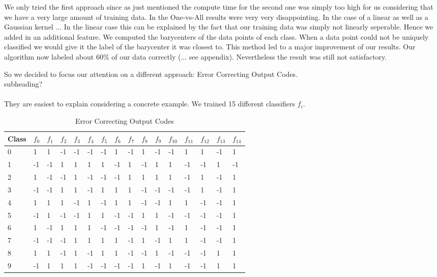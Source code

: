 We only tried the first approach since as just mentioned the compute time for the second one was simply too high for us considering that we have a very large amount of training data. In the One-vs-All results were very very disappointing. In the case of a linear as well as a Gaussian kernel ... In the linear case this can be explained by the fact that our training data was simply not linearly seperable. 
Hence we added in an additional feature. We computed the barycenters of the data points of each class. When a data point could not be uniquely classified we would give it the label of the barycenter it was closest to. This method led to a major improvement of our results. Our algorithm now labeled about 60\% of our data correctly (... see appendix).  Nevertheless the result was still not satisfactory. 

So we decided to focus our attention on a different approach: Error Correcting Output Codes. 
\\
subheading? \\
\\
They are easiest to explain considering a concrete example. We trained 15 different classifiers $f_i$. 

\begin{table}[ht!]
	\centering
	\caption{Error Correcting Output Codes}
	\label{Codewords}
	\begin{tabular}{|l|l|l|l|l|l|l|l|l|l|l|l|l|l|l|l|}
		\hline
		Class	& $f_0$ & $f_1$ & $f_2$ & $f_3$ & $f_4$ & $f_5$ & $f_6$ & $f_7$ & $f_8$ & $f_9$ & $f_{10}$ & $f_{11}$ & $f_{12}$ & $f_{13}$ & $f_{14}$ \\ \hline \hline
		0	& 1 & 1 & -1 & -1 & -1 & -1 & 1 & -1 & 1 & -1 & -1 & 1 & 1 & -1 & 1 \\ \hline
		1	& -1 & -1 & 1 & 1 & 1 & 1 & -1 & 1 & -1 & 1 & 1 & -1 & -1 & 1 & -1 \\ \hline
		2	& 1 & -1 & -1 & 1 & -1 & -1 & -1 & 1 & 1 & 1 & 1 & -1 & 1 & -1 & 1 \\ \hline
		3	& -1 & -1 & 1 & 1 & -1 & 1 & 1 & 1 & -1 & -1 & -1 & -1 & 1 & -1 & 1 \\ \hline
		4	& 1 & 1 & 1 & -1 & 1 & -1 & 1 & 1 & -1 & -1 & 1 & 1 & -1 & -1 & 1 \\ \hline
		5	& -1 & 1 & -1 & -1 & 1 & 1 & -1 & -1 & 1 & 1 & -1 & -1 & -1 & -1 & 1 \\ \hline
		6	& 1 & -1 & 1 & 1 & 1 & -1 & -1 & -1 & -1 & 1 & -1 & 1 & -1 & -1 & 1 \\ \hline
		7	& -1 & -1 & -1 & 1 & 1 & 1 & 1 & -1 & 1 & -1 & 1 & 1 & -1 & -1 & 1 \\ \hline
		8	& 1 & 1 & -1 & 1 & -1 & 1 & 1 & -1 & -1 & 1 & -1 & -1 & -1 & 1 & 1 \\ \hline
		9	& -1 & 1 & 1 & 1 & -1 & -1 & -1 & -1 & 1 & -1 & 1 & -1 & -1 & 1 & 1 \\ \hline
	\end{tabular}
\end{table}  

